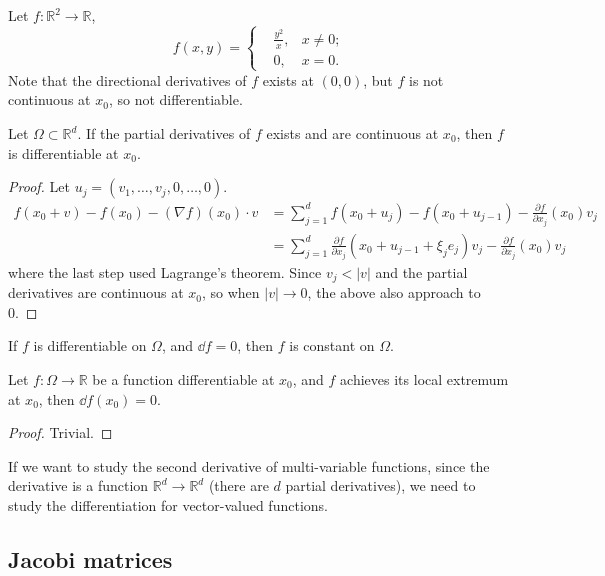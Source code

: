 \begin{example}
    Let $f: \mathbb{R}^2\to \mathbb{R}$,
	\[
	f(x,y) = \left\{
	\begin{aligned}
		&\frac{y^2}{x}, &x\ne 0;\\
		&0, &x = 0.
	\end{aligned}\right.
	\]
	Note that the directional derivatives of $f$ exists at $(0,0)$, but
	$f$ is not continuous at $x_0$, so not differentiable.
\end{example}

\begin{theorem}
    Let $\Omega \subset \mathbb{R}^{d}$.
	If the partial derivatives of $f$ exists and are continuous at $x_0$,
	then $f$ is differentiable at $x_0$.
\end{theorem}
\begin{proof}[Proof]
    Let $u_j = (v_1,\dots,v_j,0,\dots,0)$.
	\begin{align*}
	f(x_0+v) - f(x_0) - (\nabla f)(x_0)\cdot v
	&= \sum_{j=1}^{d} f(x_0+u_j) - f(x_0 + u_{j-1})
	- \frac{\partial f}{\partial x_j}(x_0)v_j\\
	&= \sum_{j=1}^{d} \frac{\partial f}{\partial x_j}(x_0 + u_{j-1} + \xi_je_j)v_j
	- \frac{\partial f}{\partial x_j}(x_0)v_j
	\end{align*}
	where the last step used Lagrange's theorem.
	Since $v_j < |v|$ and the partial derivatives are continuous at $x_0$,
	so when $|v|\to 0$, the above also approach to 0.
\end{proof}

\begin{corollary}
    If $f$ is differentiable on $\Omega$, and  $\dd f = 0$, then
	$f$ is constant on $\Omega$.
\end{corollary}
\begin{proposition}
	Let $f: \Omega \to \mathbb{R}$ be a function differentiable at $x_0$,
	and $f$ achieves its local extremum at $x_0$, then $\dd f(x_0) = 0$.
\end{proposition}
\begin{proof}[Proof]
    Trivial.
\end{proof}

If we want to study the second derivative of multi-variable
functions, since the derivative is a function
$\mathbb{R}^{d}\to \mathbb{R}^{d}$ (there are $d$ partial
derivatives), we need to
study the differentiation for vector-valued functions.
\subsection{Jacobi matrices}
\label{sub:Jacobi matrices}

